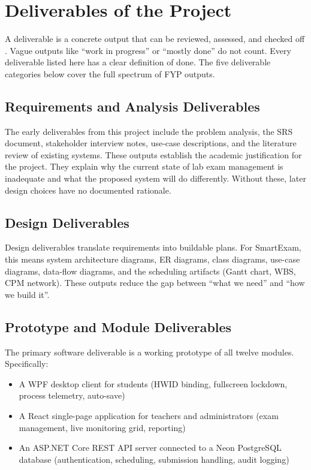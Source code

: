 \section{Deliverables of the Project}

A deliverable is a concrete output that can be reviewed, assessed, and checked off \cite{del1}. Vague outputs like ``work in progress'' or ``mostly done'' do not count. Every deliverable listed here has a clear definition of done. The five deliverable categories below cover the full spectrum of FYP outputs.

\subsection{Requirements and Analysis Deliverables}

The early deliverables from this project include the problem analysis, the SRS document, stakeholder interview notes, use-case descriptions, and the literature review of existing systems. These outputs establish the academic justification for the project. They explain why the current state of lab exam management is inadequate and what the proposed system will do differently. Without these, later design choices have no documented rationale.

\subsection{Design Deliverables}

Design deliverables translate requirements into buildable plans. For SmartExam, this means system architecture diagrams, ER diagrams, class diagrams, use-case diagrams, data-flow diagrams, and the scheduling artifacts (Gantt chart, WBS, CPM network). These outputs reduce the gap between ``what we need'' and ``how we build it''.

\subsection{Prototype and Module Deliverables}

The primary software deliverable is a working prototype of all twelve modules. Specifically:

\begin{itemize}[noitemsep]
\item A WPF desktop client for students (HWID binding, fullscreen lockdown, process telemetry, auto-save)
\item A React single-page application for teachers and administrators (exam management, live monitoring grid, reporting)
\item An ASP.NET Core REST API server connected to a Neon PostgreSQL database (authentication, scheduling, submission handling, audit logging)
\end{itemize}

